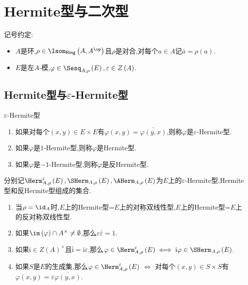 \chapter{Hermite型与二次型}

记号约定:
\begin{itemize}
	\item $A$是环,$\rho\in\Isom_{\mathsf{Ring}}\left(A,A^{\op}\right)$且$\rho$是对合,对每个$a\in A$记$\bar{a}=\rho\left(a\right)$.
	\item $E$是左$A$-模,$\varphi\in\Sesq_{A,\rho}\left(E\right),\varepsilon\in Z\left(A\right)$.
\end{itemize}

\section{Hermite型与\texorpdfstring{$\varepsilon$}{epsilon}-Hermite型}

\begin{definition}{$\varepsilon$-Hermite型}{}
	\begin{enumerate}
		\item 如果对每个$\left(x,y\right)\in E\times E$有$\varphi\left(x,y\right)=\bar{\varphi\left(y,x\right)}$,则称$\varphi$是$\varepsilon$-Hermite型.
		\item 如果$\varphi$是$1$-Hermite型,则称$\varphi$是Hermite型.
		\item 如果$\varphi$是$-1$-Hermite型,则称$\varphi$是反Hermite型.
	\end{enumerate}
\end{definition}

\begin{definition}{}{}
	分别记$\Herm_{A,\rho}^{\varepsilon}\left(E\right),\SHerm_{A,\rho}\left(E\right),\AHerm_{A,\rho}\left(E\right)$为$E$上的$\varepsilon$-Hermite型,Hermite型和反Hermite型组成的集合.
\end{definition}

\begin{remark}{}{}
	\begin{enumerate}
		\item 当$\rho=\id_{A}$时,$E$上的Hermite型=$E$上的对称双线性型,$E$上的Hermite型=$E$上的反对称双线性型.
		\item 如果$\im\left(\varphi\right)\cap A^{\times}\neq\emptyset$,那么$\varepsilon\bar{\varepsilon}=1$.
		\item 如果$\mathrm{i}\in Z\left(A\right)^{\times}$且$\bar{\mathrm{i}}=\mathrm{i}\varepsilon$,那么$\varphi\in\Herm_{A,\rho}^{\varepsilon}\left(E\right)\iff \mathrm{i}\varphi\in\SHerm_{A,\rho}\left(E\right)$.
		\item 如果$S$是$E$的生成集,那么$\varphi\in\Herm_{A,\rho}^{\varepsilon}\left(E\right)$ $\iff$ 对每个$\left(x,y\right)\in S\times S$有$\varphi\left(x,y\right)=\varepsilon\overline{\varphi\left(y,x\right)}$.
	\end{enumerate}
\end{remark}


